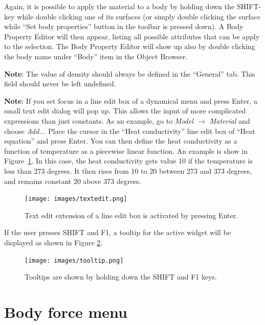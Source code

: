 Again, it is possible to apply the material to a body by holding down the
SHIFT-key while double clicking one of its surfaces (or simply double clicking the surface while ``Set body properties'' button in the toolbar is pressed down).
A Body Property Editor will then appear,
listing all possible attributes that can be apply to the selection. The Body Property Editor will show up also by double clicking the body name under ``Body'' item in the Object Browser. 

\vskip2mm

{\bf Note}: The value of density should always be defined in the ``General'' tab. This
field should never be left undefined.

\vskip2mm

{\bf Note}: If you set focus in a line edit box of a dynamical menu and press Enter, a small
text edit dialog will pop up. This allows the input of more complicated expressions
than just constants. As an example, go to {\it Model $\rightarrow$ Material} and choose
{\it Add...} Place the cursor in the ``Heat conductivity'' line edit box of ``Heat
equation'' and press Enter. You can then define the heat conductivity
as a function of temperature as a piecewise linear function. An example is show in
Figure~\ref{fig_editbox}. In this case, the heat conductivity gets value 10 if the temperature is less
than 273 degrees. It then rises from 10 to 20 between 273 and 373 degrees, and
remains constant 20 above 373 degrees.

\begin{figure}[htb]
	\begin{center}
		\texttt{[image: images/textedit.png]}
		\caption{Text edit extension of a line edit box is activated by pressing Enter.}
		\label{fig_editbox}
	\end{center}
\end{figure}

If the user presses SHIFT and F1, a tooltip for the active widget will be displayed as shown in Figure \ref{fig:tooltip}.

\begin{figure}[htb]
	\begin{center}
		\texttt{[image: images/tooltip.png]}
		\caption{Tooltips are shown by holding down the SHIFT and F1 keys.}
		\label{fig:tooltip}
	\end{center}
\end{figure}

\section{Body force menu}

